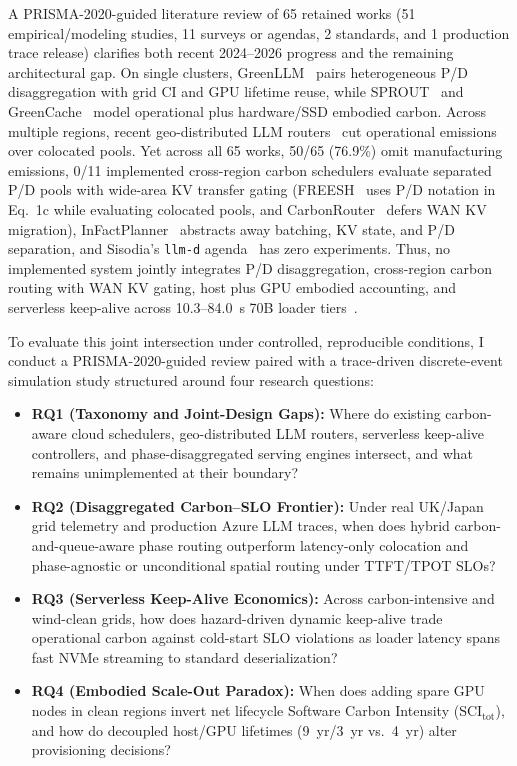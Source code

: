 A PRISMA-2020-guided literature review of 65 retained works (51 empirical/modeling studies, 11 surveys or agendas, 2 standards, and 1 production trace release) clarifies both recent 2024--2026 progress and the remaining architectural gap. On single clusters, GreenLLM~\cite{shi2024greenllm} pairs heterogeneous P/D disaggregation with grid CI and GPU lifetime reuse, while SPROUT~\cite{li2024sprout} and GreenCache~\cite{tian2026greencache} model operational plus hardware/SSD embodied carbon. Across multiple regions, recent geo-distributed LLM routers~\cite{topcu2026tension,moore2025slit,zhang2026context,bernhard2026cleanest,he2025freesh,more2026cedar,cheng2026greenllm} cut operational emissions over colocated pools. Yet across all 65 works, 50/65 (76.9\%) omit manufacturing emissions, 0/11 implemented cross-region carbon schedulers evaluate separated P/D pools with wide-area KV transfer gating (FREESH~\cite{he2025freesh} uses P/D notation in Eq.~1c while evaluating colocated pools, and CarbonRouter~\cite{zhang2026context} defers WAN KV migration), InFactPlanner~\cite{tsiopani2026infactplanner} abstracts away batching, KV state, and P/D separation, and Sisodia's \texttt{llm-d} agenda~\cite{sisodia2026sicp} has zero experiments. Thus, no implemented system jointly integrates P/D disaggregation, cross-region carbon routing with WAN KV gating, host plus GPU embodied accounting, and serverless keep-alive across 10.3--84.0~s 70B loader tiers~\cite{fu2024serverlessllm}.

To evaluate this joint intersection under controlled, reproducible conditions, I conduct a PRISMA-2020-guided review paired with a trace-driven discrete-event simulation study structured around four research questions:
\begin{itemize}
    \item \textbf{RQ1 (Taxonomy and Joint-Design Gaps):} Where do existing carbon-aware cloud schedulers, geo-distributed LLM routers, serverless keep-alive controllers, and phase-disaggregated serving engines intersect, and what remains unimplemented at their boundary?
    \item \textbf{RQ2 (Disaggregated Carbon--SLO Frontier):} Under real UK/Japan grid telemetry and production Azure LLM traces, when does hybrid carbon-and-queue-aware phase routing outperform latency-only colocation and phase-agnostic or unconditional spatial routing under TTFT/TPOT SLOs?
    \item \textbf{RQ3 (Serverless Keep-Alive Economics):} Across carbon-intensive and wind-clean grids, how does hazard-driven dynamic keep-alive trade operational carbon against cold-start SLO violations as loader latency spans fast NVMe streaming to standard deserialization?
    \item \textbf{RQ4 (Embodied Scale-Out Paradox):} When does adding spare GPU nodes in clean regions invert net lifecycle Software Carbon Intensity ($\text{SCI}_{\text{tot}}$), and how do decoupled host/GPU lifetimes (9~yr/3~yr vs.\ 4~yr) alter provisioning decisions?
\end{itemize}

